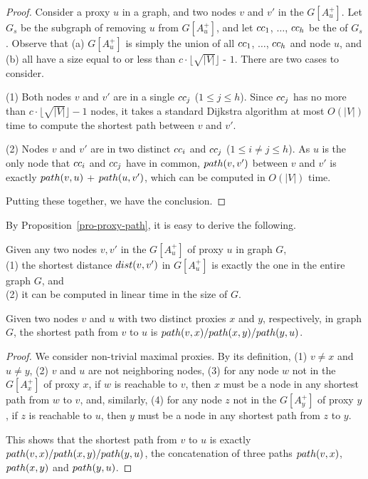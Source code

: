 \begin{proof} Consider a proxy $u$ in a graph, and two nodes $v$ and $v'$ in the \dra $G[A^+_u]$.
%
Let $G_s$ be the subgraph of removing $u$ from $G[A^+_u]$, and let ${\sc cc}_{1}$, $\ldots$, ${\sc cc}_{h}$ be the \ccs of $G_s$.
Observe that (a)  $G[A^+_{u}]$ is simply the union of all \ccs ${\sc cc}_{1}$, $\ldots$, ${\sc cc}_{h}$ and node $u$, and (b)
all \ccs have a size equal to or less than $c\cdot\lfloor\sqrt{|V|}\rfloor$ - $1$.  There are two cases to consider.

(1) Both nodes $v$ and $v'$ are in a single \cc ${\sc cc}_{j}$ ($1\le j\le h$).
Since \cc ${\sc cc}_{j}$ has no more than $c\cdot\lfloor\sqrt{|V|}\rfloor - 1$ nodes, it takes a standard Dijkstra algorithm at most $O(|V|)$ time to compute the shortest path between $v$ and $v'$.

(2) Nodes $v$ and $v'$ are in two distinct \ccs ${\sc cc}_{i}$ and ${\sc cc}_{j}$ ($1\le i\ne j\le h$).
As $u$ is the only node that ${\sc cc}_{i}$ and ${\sc cc}_{j}$ have in common, $\path(v,v')$ between $v$ and $v'$ is exactly $\path(v,u)$ + $\path(u,v')$, which can be computed in $O(|V|)$  time.

Putting these together, we have the conclusion.
\end{proof}

By Proposition~\ref{pro-proxy-path}, it is easy to derive the following.

\begin{cor}
\label{cor-proxy-distance} Given any two nodes $v, v'$ in the \dra $G[A^+_u]$ of proxy $u$ in graph $G$, \\
(1) the shortest distance $\dist(v, v')$ in $G[A^+_u]$ is exactly the one in the entire graph $G$, and\\
(2) it can be computed in linear time in the size of $G$.
\end{cor}


\begin{prop}
\label{pro-proxy-path-global} Given two nodes $v$ and $u$ with two distinct proxies $x$ and $y$, respectively, in graph $G$, the shortest path from $v$ to $u$ is $\path(v, x)/\path(x, y)/\path(y, u)$.
\end{prop}

\begin{proof}
We consider non-trivial maximal proxies. By its definition, (1) $v\neq x$ and $u\neq y$, (2) $v$ and $u$ are not neighboring nodes, (3)
for any node $w$ not in the \dra $G[A^+_{x}]$ of proxy $x$,  if $w$ is reachable to $v$, then $x$ must be a node in any shortest path from $w$ to $v$,
and, similarly, (4)  for any node $z$ not in the \dra $G[A^+_{y}]$ of proxy $y$,  if $z$ is reachable to $u$, then $y$ must be a node in any shortest path from $z$ to $y$.

This shows that the shortest path from $v$ to $u$ is exactly $\path(v, x)/\path(x, y)/\path(y, u)$, \ie the concatenation of three paths $\path(v, x)$, $\path(x, y)$ and $\path(y, u)$.
\end{proof}


